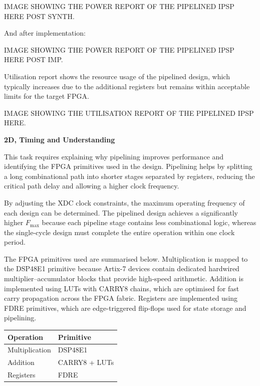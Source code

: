\documentclass[a4paper,12pt]{article}
\begin{document}
\begin{large}
    IMAGE SHOWING THE POWER REPORT OF THE PIPELINED IPSP HERE POST SYNTH.
\end{large}

And after implementation:

\begin{large}
    IMAGE SHOWING THE POWER REPORT OF THE PIPELINED IPSP HERE POST IMP.
\end{large}

Utilisation report shows the resource usage of the pipelined design, which typically increases due to the additional registers but remains within acceptable limits for the target FPGA.

\begin{large}
    IMAGE SHOWING THE UTILISATION REPORT OF THE PIPELINED IPSP HERE.
\end{large}

\textbf{2D, Timing and Understanding}

This task requires explaining why pipelining improves performance and identifying the FPGA primitives used in the design. Pipelining helps by splitting a long combinational path into shorter stages separated by registers, reducing the critical path delay and allowing a higher clock frequency.

By adjusting the XDC clock constraints, the maximum operating frequency of each design can be determined. The pipelined design achieves a significantly higher $F_{\text{max}}$ because each pipeline stage contains less combinational logic, whereas the single-cycle design must complete the entire operation within one clock period.

The FPGA primitives used are summarised below. Multiplication is mapped to the DSP48E1 primitive because Artix-7 devices contain dedicated hardwired multiplier--accumulator blocks that provide high-speed arithmetic. Addition is implemented using LUTs with CARRY8 chains, which are optimised for fast carry propagation across the FPGA fabric. Registers are implemented using FDRE primitives, which are edge-triggered flip-flops used for state storage and pipelining.

\begin{table}[h]
\centering
\begin{tabular}{l l}
\hline
\textbf{Operation} & \textbf{Primitive} \\
\hline
Multiplication & DSP48E1 \\
Addition & CARRY8 + LUTs \\
Registers & FDRE \\
\hline
\end{tabular}
\end{table}
\end{document}
